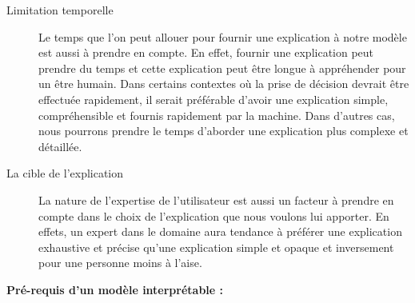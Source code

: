 \begin{description}
\item[Limitation temporelle] Le temps que l'on peut allouer pour fournir une explication à notre modèle est aussi à prendre en compte. En effet, fournir une explication peut prendre du temps et cette explication peut être longue à appréhender pour un être humain. Dans certains contextes où la prise de décision devrait être effectuée rapidement, il serait préférable d'avoir une explication simple, compréhensible et fournis rapidement par la machine. Dans d'autres cas, nous pourrons prendre le temps d'aborder une explication plus complexe et détaillée.

\item[La cible de l'explication] La nature de l'expertise de l'utilisateur est aussi un facteur à prendre en compte dans le choix de l'explication que nous voulons lui apporter. En effets, un expert dans le domaine aura tendance à préférer une explication exhaustive et précise qu'une explication simple et opaque et inversement pour une personne moins à l'aise.
\end{description}

\textbf{Pré-requis d'un modèle interprétable :}\\

